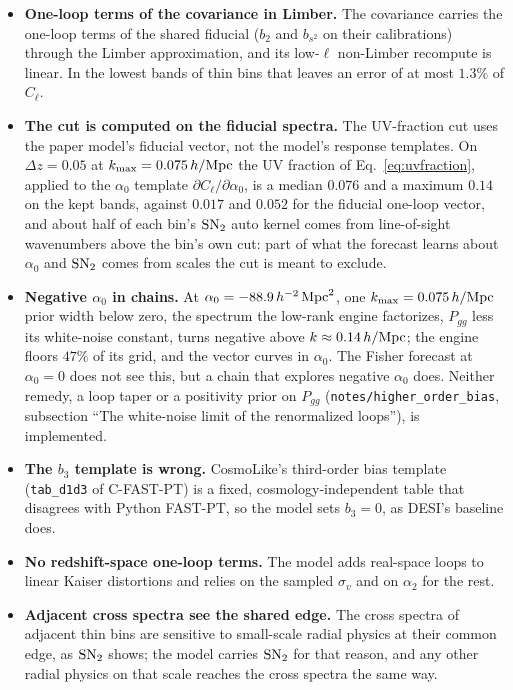 \documentclass[11pt]{article}
\newcommand{\kmax}{k_{\rm max}}
\newcommand{\hMpc}{\,h/{\rm Mpc}}
\newcommand{\bstwo}{b_{s^2}}
\newcommand{\aunit}{\,h^{-2}\,{\rm Mpc}^2}
\newcommand{\SNt}{{\rm SN}_2}
\begin{document}
\begin{itemize}
  \item \textbf{One-loop terms of the covariance in Limber.}  The
    covariance carries the one-loop terms of the shared fiducial
    ($b_2$ and $\bstwo$ on their calibrations) through the Limber
    approximation, and its low-$\ell$ non-Limber recompute is linear.
    In the lowest bands of thin bins that leaves an error of at most
    $1.3\%$ of $C_\ell$.
  \item \textbf{The cut is computed on the fiducial spectra.}  The
    UV-fraction cut uses the paper model's fiducial vector, not the
    model's response templates.  On $\Delta z = 0.05$ at
    $\kmax = 0.075\hMpc$ the UV fraction of Eq.~\eqref{eq:uvfraction},
    applied to the $\alpha_0$ template
    $\partial C_\ell/\partial\alpha_0$, is a median $0.076$ and a
    maximum $0.14$ on the kept bands, against $0.017$ and $0.052$ for
    the fiducial one-loop vector, and about half of each bin's $\SNt$
    auto kernel comes from line-of-sight wavenumbers above the bin's
    own cut: part of what the forecast learns about $\alpha_0$ and
    $\SNt$ comes from scales the cut is meant to exclude.
  \item \textbf{Negative $\alpha_0$ in chains.}  At
    $\alpha_0 = -88.9\aunit$, one $\kmax = 0.075\hMpc$ prior width
    below zero, the spectrum
    the low-rank engine factorizes, $P_{gg}$ less its white-noise
    constant, turns negative above $k \approx 0.14\hMpc$; the engine
    floors $47\%$ of its grid, and the vector curves in $\alpha_0$.
    The Fisher forecast at $\alpha_0 = 0$ does not see this, but a
    chain that explores negative $\alpha_0$ does.  Neither remedy, a
    loop taper or a positivity prior on $P_{gg}$
    (\texttt{notes/higher\_order\_bias}, subsection ``The white-noise
    limit of the renormalized loops''), is implemented.
  \item \textbf{The $b_3$ template is wrong.}  CosmoLike's third-order
    bias template (\texttt{tab\_d1d3} of C-FAST-PT) is a fixed,
    cosmology-independent table that disagrees with Python FAST-PT, so
    the model sets $b_3 = 0$, as DESI's baseline does.
  \item \textbf{No redshift-space one-loop terms.}  The model adds
    real-space loops to linear Kaiser distortions and relies on
    the sampled $\sigma_v$ and on $\alpha_2$ for the rest.
  \item \textbf{Adjacent cross spectra see the shared edge.}  The
    cross spectra of adjacent thin bins are sensitive to small-scale
    radial physics at their common edge, as $\SNt$ shows; the model
    carries $\SNt$ for that reason, and any other radial physics on
    that scale reaches the cross spectra the same way.
\end{itemize}
\end{document}
